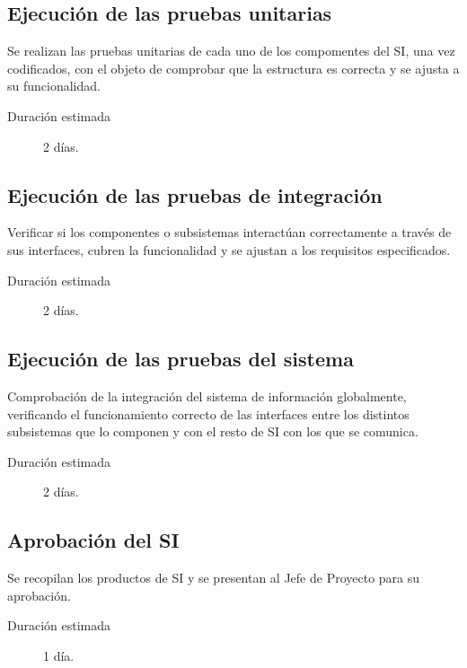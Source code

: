 \documentclass[11pt,a4paper,spanish,twoside]{report}
\begin{document}
\subsection{Ejecución de las pruebas unitarias}
Se realizan las pruebas unitarias de cada uno de los compomentes del SI, una
vez codificados, con el objeto de comprobar que la estructura es correcta y
se ajusta a su funcionalidad. 
\begin{description}
\item[Duración estimada] 2 días.
\end{description}

\subsection{Ejecución de las pruebas de integración}
Verificar si los componentes o subsistemas interactúan correctamente a través
de sus interfaces, cubren la funcionalidad y se ajustan a los requisitos 
especificados. 
\begin{description}
\item[Duración estimada] 2 días.
\end{description}

\subsection{Ejecución de las pruebas del sistema}
Comprobación de la integración del sistema de información globalmente,
verificando el funcionamiento correcto de las interfaces entre los distintos
subsistemas que lo componen y con el resto de SI con los que se comunica. 
\begin{description}
\item[Duración estimada] 2 días.
\end{description}

\subsection{Aprobación del SI}
Se recopilan los productos de SI y se presentan al Jefe de Proyecto para su
aprobación.
\begin{description}
\item[Duración estimada] 1 día.
\end{description}

 

\end{document}
